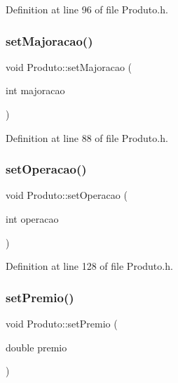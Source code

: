 Definition at line 96 of file Produto.\+h.

\hypertarget{class_produto_a1d7370992bebc864e3bbdf322f407c10}{}\label{class_produto_a1d7370992bebc864e3bbdf322f407c10} 
\subsubsection{\texorpdfstring{set\+Majoracao()}{setMajoracao()}}
{\footnotesize\ttfamily void Produto\+::set\+Majoracao (\begin{DoxyParamCaption}\item[{int}]{majoracao }\end{DoxyParamCaption})\hspace{0.3cm}{\ttfamily [inline]}}



Definition at line 88 of file Produto.\+h.

\hypertarget{class_produto_aa167285c5ec052160888e1ece8d128bf}{}\label{class_produto_aa167285c5ec052160888e1ece8d128bf} 
\subsubsection{\texorpdfstring{set\+Operacao()}{setOperacao()}}
{\footnotesize\ttfamily void Produto\+::set\+Operacao (\begin{DoxyParamCaption}\item[{int}]{operacao }\end{DoxyParamCaption})\hspace{0.3cm}{\ttfamily [inline]}}



Definition at line 128 of file Produto.\+h.

\hypertarget{class_produto_ae516599e859fa6ef3e8340b4a8d51569}{}\label{class_produto_ae516599e859fa6ef3e8340b4a8d51569} 
\subsubsection{\texorpdfstring{set\+Premio()}{setPremio()}}
{\footnotesize\ttfamily void Produto\+::set\+Premio (\begin{DoxyParamCaption}\item[{double}]{premio }\end{DoxyParamCaption})\hspace{0.3cm}{\ttfamily [inline]}}



